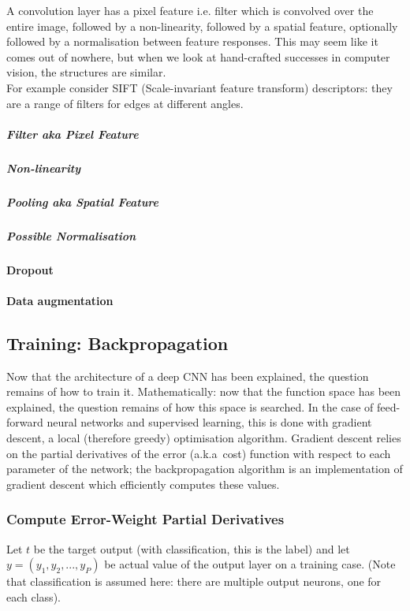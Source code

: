 \documentclass[a4paper,11pt]{article}
\begin{document}
A convolution layer has a pixel feature i.e. filter which is convolved over the entire image, followed by a non-linearity, followed by a spatial feature, optionally followed by a normalisation between feature responses. This may seem like it comes out of nowhere, but when we look at hand-crafted successes in computer vision, the structures are similar. \\

For example consider SIFT (Scale-invariant feature transform) descriptors: they are a range of filters for edges at different angles. \\

\subparagraph{Filter aka Pixel Feature}

 
\subparagraph{Non-linearity}

\subparagraph{Pooling aka Spatial Feature}

\subparagraph{Possible Normalisation}

\paragraph{Dropout}

\paragraph{Data augmentation}


\subsection{Training: Backpropagation}

Now that the architecture of a deep CNN has been explained, the question remains of how to train it. Mathematically: now that the function space has been explained, the question remains of how this space is searched. In the case of feed-forward neural networks and supervised learning, this is done with gradient descent, a local (therefore greedy) optimisation algorithm. Gradient descent relies on the partial derivatives of the error (a.k.a\ cost) function with respect to each parameter of the network; the backpropagation algorithm is an implementation of gradient descent which efficiently computes these values.
  
\subsubsection{Compute Error-Weight Partial Derivatives}

Let $t$ be the target output (with classification, this is the label) and let $y = (y_{1}, y_{2}, ..., y_{P})$ be actual value of the output layer on a training case. (Note that classification is assumed here: there are multiple output neurons, one for each class).
\end{document}
